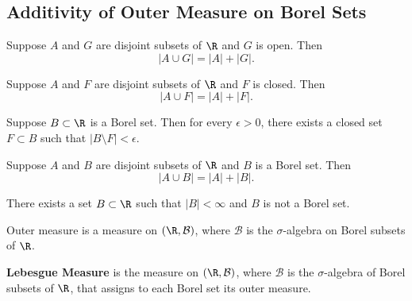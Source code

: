 \subsection{Additivity of Outer Measure on Borel Sets}

\begin{prop}
   Suppose \( A  \) and \( G  \) are disjoint subsets of \( \R  \) and \( G  \) is open. Then 
   \[ | A \cup G  | = | A  |  + | G |.   \]
\end{prop}

\begin{prop}
    Suppose \( A  \) and \( F  \) are disjoint subsets of \( \R  \) and \( F  \) is closed. Then
    \[  | A \cup F  |  = | A  |  + | F |. \]
\end{prop}

\begin{prop}
    Suppose \( B \subset \R  \) is a Borel set. Then for every \( \epsilon > 0  \), there exists a closed set \( F \subset  B   \) such that \( | B \setminus  F   | < \epsilon \).
\end{prop}

\begin{prop}
   Suppose \( A  \) and \( B  \) are disjoint subsets of \( \R  \) and \( B  \) is a Borel set. Then 
   \[  | A \cup B  |  = | A  |  + | B  |. \]
\end{prop}

\begin{prop}
   There exists a set \( B \subset \R  \) such that \( | B  |  < \infty   \) and \( B  \) is not a Borel set. 
\end{prop}

\begin{prop}
    Outer measure is a measure on \( (\R, \mathcal{B})  \), where \( \mathcal{B}  \) is the \( \sigma \)-algebra on Borel subsets of \( \R  \).
\end{prop}

\begin{definition}
    \textbf{Lebesgue Measure} is the measure on \( (\R, \mathcal{B}) \), where \( \mathcal{B} \) is the \( \sigma \)-algebra of Borel subsets of \( \R  \), that assigns to each Borel set its outer measure.
\end{definition}


